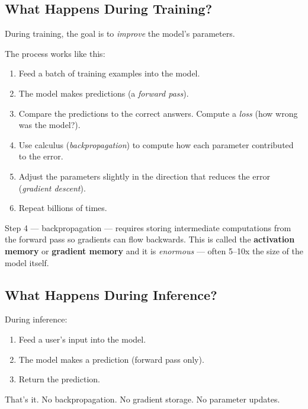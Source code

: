 \documentclass[12pt, twoside, openright]{book}
\newcommand{\term}[1]{\textbf{\color{chaptercolor}#1}}
\begin{document}
\subsection{What Happens During Training?}

During training, the goal is to \textit{improve} the model's parameters.

The process works like this:
\begin{enumerate}
  \item Feed a batch of training examples into the model.
  \item The model makes predictions (a \textit{forward pass}).
  \item Compare the predictions to the correct answers.
        Compute a \textit{loss} (how wrong was the model?).
  \item Use calculus (\textit{backpropagation}) to compute how each
        parameter contributed to the error.
  \item Adjust the parameters slightly in the direction that reduces
        the error (\textit{gradient descent}).
  \item Repeat billions of times.
\end{enumerate}

Step 4 --- backpropagation --- requires storing intermediate computations
from the forward pass so gradients can flow backwards.
This is called the \term{activation memory} or \term{gradient memory}
and it is \textit{enormous} --- often 5--10x the size of the model itself.

\subsection{What Happens During Inference?}

During inference:
\begin{enumerate}
  \item Feed a user's input into the model.
  \item The model makes a prediction (forward pass only).
  \item Return the prediction.
\end{enumerate}

That's it. No backpropagation. No gradient storage. No parameter updates.
\end{document}
